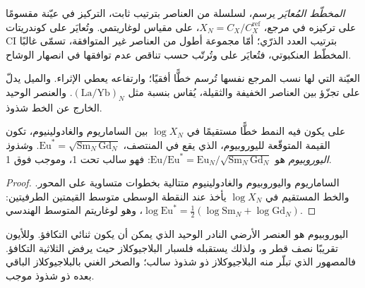 \begin{definition}\label{def:b2:elements-in-the-earth:normalised}
\emph{المخطّط المُعايَر} يرسم، لسلسلة من
العناصر بترتيب ثابت، التركيز في عيّنة مقسومًا على تركيزه في
مرجع، $X_N = C_X/C_X^{\mathrm{ref}}$، على مقياس لوغاريتمي. وتُعايَر 
على كوندريتات CI بترتيب العدد الذرّي؛ أمّا مجموعة أطول من
العناصر غير المتوافقة، تسمّى غالبًا المخطّط العنكبوتي، فتُعايَر على
 وتُرتّب حسب تناقص عدم توافقها في انصهار الوشاح.
\end{definition}

العيّنة التي لها نسب المرجع نفسها تُرسم خطًّا أفقيًا؛
وارتفاعه يعطي الإثراء. والميل يدلّ على تجزّؤ بين العناصر الخفيفة
والثقيلة، يُقاس بنسبة مثل $(\mathrm{La}/\mathrm{Yb})_N$. والعنصر
الوحيد الخارج عن الخط شذوذ.

\begin{proposition}\label{prop:b2:elements-in-the-earth:normalised}
على  يكون فيه النمط خطًّا مستقيمًا في
$\log X_N$ بين الساماريوم والغادولينيوم، تكون القيمة المتوقّعة لليوروبيوم، الذي
يقع في المنتصف، $\mathrm{Eu}^* = \sqrt{\mathrm{Sm}_N\,\mathrm{Gd}_N}$.
و\emph{شذوذ اليوروبيوم} هو
$\mathrm{Eu}/\mathrm{Eu}^* = \mathrm{Eu}_N/\sqrt{\mathrm{Sm}_N\,\mathrm{Gd}_N}$:
فهو سالب تحت 1، وموجب فوق 1.
\end{proposition}

\begin{proof}
الساماريوم واليوروبيوم والغادولينيوم متتالية بخطوات متساوية على المحور.
والخط المستقيم في $\log X_N$ يأخذ عند النقطة الوسطى متوسط القيمتين الطرفيتين:
$\log \mathrm{Eu}^* = \tfrac12(\log \mathrm{Sm}_N + \log \mathrm{Gd}_N)$، وهو
لوغاريتم المتوسط الهندسي.
\end{proof}

اليوروبيوم هو العنصر الأرضي النادر الوحيد الذي يمكن أن يكون ثنائي التكافؤ. وللأيون  تقريبًا
نصف قطر  و، ولذلك يستقبله فلسبار البلاجيوكلاز حيث
يرفض  الثلاثية التكافؤ. فالمصهور الذي تبلّر منه البلاجيوكلاز
ذو شذوذ سالب؛ والصخر الغني بالبلاجيوكلاز الباقي بعده ذو شذوذ موجب.

